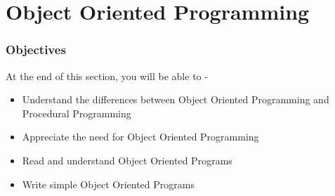 \section{Object Oriented Programming}

\begin{frame}[fragile]
  \frametitle{Objectives}
  At the end of this section, you will be able to -
  \begin{itemize}
  \item Understand the differences between Object Oriented Programming
    and Procedural Programming
  \item Appreciate the need for Object Oriented Programming
  \item Read and understand Object Oriented Programs
  \item Write simple Object Oriented Programs
  \end{itemize}
\end{frame}



